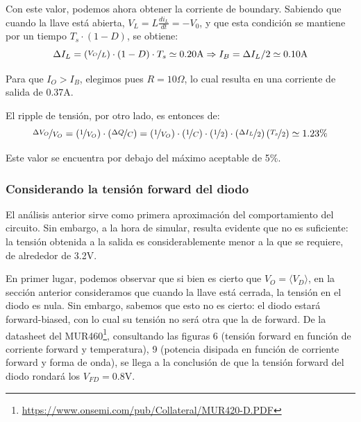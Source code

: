 \documentclass[e4_tp1_main.tex]{subfiles}
\begin{document}
Con este valor, podemos ahora obtener la corriente de boundary. Sabiendo que cuando la llave est\'a abierta, $V_L = L \frac{di_L}{dt} = -V_0$, y que esta condici\'on se mantiene por un tiempo $T_s \cdot (1-D)$, se obtiene:
\begin{equation}
	\Delta I_L = \left(\nicefrac{V_O}{L}\right) \cdot (1-D) \cdot T_s \simeq 0.20\text{A}
	\Rightarrow
	I_{B} = \Delta I_L/2 \simeq 0.10\text{A}
\end{equation} 

Para que $I_O > I_B$, elegimos pues $R = 10\Omega$, lo cual resulta en una corriente de salida de 0.37A.

El ripple de tensi\'on, por otro lado, es entonces de:
\begin{equation}
	\nicefrac{\Delta V_O}{V_O} 
	= \left(\nicefrac{1}{V_O}\right) \cdot \left(\nicefrac{\Delta Q}{C}\right) 
	= \left(\nicefrac{1}{V_O}\right) 
	\cdot \left(\nicefrac{1}{C}\right) \cdot \left(\nicefrac{1}{2}\right) \cdot \left(\nicefrac{\Delta I_L}{2}\right) \left(\nicefrac{T_s}{2}\right)
	\simeq 1.23 \%	
	\label{eq:ripple1}
\end{equation}

Este valor se encuentra por debajo del m\'aximo aceptable de 5\%.


\subsubsection{Considerando la tensi\'on forward del diodo}

El an\'alisis anterior sirve como primera aproximaci\'on del comportamiento del circuito. Sin embargo, a la hora de simular, resulta evidente que no es suficiente: la tensi\'on obtenida a la salida es considerablemente menor a la que se requiere, de alrededor de 3.2V.

En primer lugar, podemos observar que si bien es cierto que $V_O = \langle V_D \rangle$, en la secci\'on anterior consideramos que cuando la llave est\'a cerrada, la tensi\'on en el diodo es nula. Sin embargo, sabemos que esto no es cierto: el diodo estar\'a forward-biased, con lo cual su tensi\'on no ser\'a otra que la de forward. De la datasheet del 
MUR460\footnote{
	\url{https://www.onsemi.com/pub/Collateral/MUR420-D.PDF}
}, consultando las figuras 6 (tensi\'on forward en funci\'on de corriente forward y temperatura), 9 (potencia disipada en funci\'on de corriente forward y forma de onda), se llega a la conclusi\'on de que la tensi\'on forward del diodo rondar\'a los $V_{FD}= 0.8$V.
\end{document}
